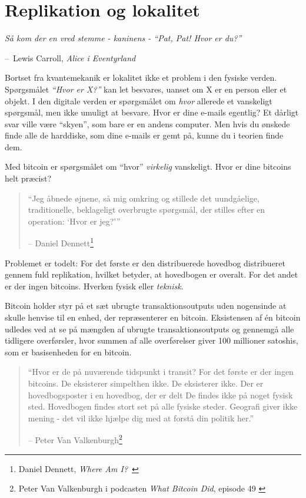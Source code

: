 \documentclass[paper=6in:9in,pagesize=pdftex,
               headinclude=on,footinclude=on,12pt]{scrbook}
\makeatletter
\newenvironment{chapquote}[2][4em]{\setlength{\@tempdima}{#1}%
   \def\chapquote@author{#2}%
   \parshape 1 \@tempdima \dimexpr\textwidth-2\@tempdima\relax%
   \itshape}{\par\normalfont\hfill--\ \chapquote@author\hspace*{\@tempdima}\par\bigskip}
\makeatother
\begin{document}
\chapter{Replikation og lokalitet}
\label{les:3}

\begin{chapquote}{Lewis Carroll, \textit{Alice i Eventyrland}} Så kom der en vred stemme - kaninens - \enquote{Pat, Pat! Hvor er du?} \end{chapquote}

Bortset fra kvantemekanik er lokalitet ikke et problem i den fysiske verden. Spørgsmålet \textit{\enquote{Hvor er X?}} kan let besvares, uanset om X er en person eller et objekt. I den digitale verden er spørgsmålet om \textit{hvor} allerede et vanskeligt spørgsmål, men ikke umuligt at besvare. Hvor er dine e-mails egentlig? Et dårligt svar ville være \enquote{skyen}, som bare er en andens computer. Men hvis du ønskede finde alle de harddiske, som dine e-mails er gemt på, kunne du i teorien finde dem.

Med bitcoin er spørgsmålet om \enquote{hvor} \textit{virkelig} vanskeligt. Hvor er dine bitcoins helt præcist?\begin{quotation}\begin{samepage} \enquote{Jeg åbnede øjnene, så mig omkring og stillede det uundgåelige, traditionelle, beklageligt overbrugte spørgsmål, der stilles efter en operation: `Hvor er jeg?'} \begin{flushright} -- Daniel Dennett\footnote{Daniel Dennett, \textit{Where Am I?}~\cite{where-am-i}}
\end{flushright}\end{samepage}\end{quotation}

Problemet er todelt: For det første er den distribuerede hovedbog distribueret gennem fuld replikation, hvilket betyder, at hovedbogen er overalt. For det andet er der ingen bitcoins. Hverken fysisk eller \textit{teknisk}.

Bitcoin holder styr på et sæt ubrugte transaktionsoutputs uden nogensinde at skulle henvise til en enhed, der repræsenterer en bitcoin. Eksistensen af \'en bitcoin udledes ved at se på mængden af ubrugte transaktionsoutputs og gennemgå alle tidligere overførsler, hvor summen af alle overførelser giver 100 millioner satoshis, som er basisenheden for en bitcoin.\begin{quotation}\begin{samepage} \enquote{Hvor er de på nuværende tidspunkt i transit? \href{...}{} For det første er der ingen bitcoins. De eksisterer simpelthen ikke. De eksisterer ikke. Der er hovedbogsposter i en hovedbog, der er delt \href{...}{} De findes ikke på noget fysisk sted. Hovedbogen findes stort set på alle fysiske steder. Geografi giver ikke mening - det vil ikke hjælpe dig med at forstå din politik her.} \begin{flushright} -- Peter Van Valkenburgh\footnote{Peter Van Valkenburgh i podcasten \textit{What Bitcoin Did}, episode 49 \cite{wbd049}}
\end{flushright}\end{samepage}\end{quotation}
\end{document}

